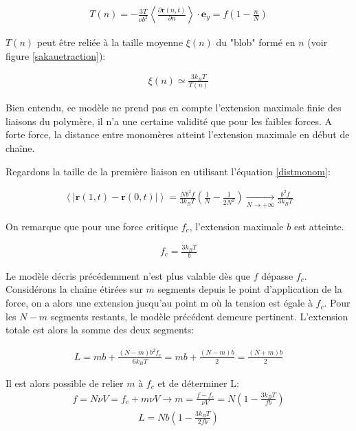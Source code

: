\documentclass[a4paper,11pt]{article}
\begin{document}
\begin{eqnarray}
T(n) = -\frac{3T}{\nu b^2}\left<\frac{\partial  \textbf{r}(n,t)}{\partial  n}\right> \cdot \textbf{e}_{y} = f \left(1-\frac{n}{N}\right)
\end{eqnarray}

$T(n)$ peut être reliée à la taille moyenne $\xi(n)$ du "blob" formé en $n$ (voir figure \ref{sakauetraction}):

\begin{eqnarray}
\xi(n) \simeq \frac{3k_BT}{T(n)}
\end{eqnarray}


Bien entendu, ce modèle ne prend pas en compte l'extension maximale finie des liaisons du polymère, il n'a une certaine validité que pour les faibles forces. A forte force, la distance entre monomères atteint l'extension maximale en début de chaîne.

Regardons la taille de la première liaison en utilisant l'équation \ref{distmonom}:

\begin{eqnarray}
\left<|\mathbf{r}(1,t)-\mathbf{r}(0,t)|\right> = \frac{Nb^2f}{3k_BT} \left(\frac{1}{N}-\frac{1}{2N^2} \right) \underset{N\to+\infty}{\longrightarrow} \frac{b^2f}{3k_BT}
\end{eqnarray} 

On remarque que pour une force critique $f_c$, l'extension maximale $b$ est atteinte.

\begin{eqnarray}
f_c=\frac{3k_BT}{b} 
\end{eqnarray} 

Le modèle décris précédemment n'est plus valable dès que $f$ dépasse $f_c$. Considérons la chaîne étirées sur $m$ segments depuis le point d'application de la force, on a alors une extension jusqu'au point m où la tension est égale à $f_c$. Pour les $N-m$ segments restants, le modèle précédent demeure pertinent.
L'extension totale est alors la somme des deux segments:

\begin{eqnarray}
L=  m b + \frac{(N-m)b^2f_c}{6k_BT} = mb + \frac{(N-m)b}{2} = \frac{(N+m)b}{2}
\end{eqnarray}

Il est alors possible de relier $m$ à $f_c$ et de déterminer L:
\begin{eqnarray}
f=  N\nu V = f_c + m\nu V \rightarrow m= \frac{f-f_c}{\nu V} = N\left(1-\frac{3k_BT}{fb}\right)
\end{eqnarray}
\begin{eqnarray}
L= Nb\left(1-\frac{3k_BT}{2
fb}\right)
\end{eqnarray}
\end{document}

